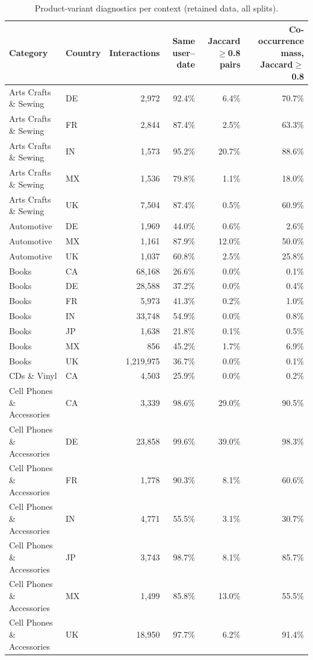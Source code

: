 \begin{longtable}{llrrrr}
\caption{Product-variant diagnostics per context (retained data, all splits).}\label{tab:variant_diag}\\
\toprule
Category & Country & Interactions & Same user--date & Jaccard$\ge$0.8 pairs & Co-occurrence mass, Jaccard$\ge$0.8 \\
\midrule\endhead
Arts Crafts \& Sewing & DE & 2,972 & 92.4\% & 6.4\% & 70.7\% \\
Arts Crafts \& Sewing & FR & 2,844 & 87.4\% & 2.5\% & 63.3\% \\
Arts Crafts \& Sewing & IN & 1,573 & 95.2\% & 20.7\% & 88.6\% \\
Arts Crafts \& Sewing & MX & 1,536 & 79.8\% & 1.1\% & 18.0\% \\
Arts Crafts \& Sewing & UK & 7,504 & 87.4\% & 0.5\% & 60.9\% \\
Automotive & DE & 1,969 & 44.0\% & 0.6\% & 2.6\% \\
Automotive & MX & 1,161 & 87.9\% & 12.0\% & 50.0\% \\
Automotive & UK & 1,037 & 60.8\% & 2.5\% & 25.8\% \\
Books & CA & 68,168 & 26.6\% & 0.0\% & 0.1\% \\
Books & DE & 28,588 & 37.2\% & 0.0\% & 0.4\% \\
Books & FR & 5,973 & 41.3\% & 0.2\% & 1.0\% \\
Books & IN & 33,748 & 54.9\% & 0.0\% & 0.8\% \\
Books & JP & 1,638 & 21.8\% & 0.1\% & 0.5\% \\
Books & MX & 856 & 45.2\% & 1.7\% & 6.9\% \\
Books & UK & 1,219,975 & 36.7\% & 0.0\% & 0.1\% \\
CDs \& Vinyl & CA & 4,503 & 25.9\% & 0.0\% & 0.2\% \\
Cell Phones \& Accessories & CA & 3,339 & 98.6\% & 29.0\% & 90.5\% \\
Cell Phones \& Accessories & DE & 23,858 & 99.6\% & 39.0\% & 98.3\% \\
Cell Phones \& Accessories & FR & 1,778 & 90.3\% & 8.1\% & 60.6\% \\
Cell Phones \& Accessories & IN & 4,771 & 55.5\% & 3.1\% & 30.7\% \\
Cell Phones \& Accessories & JP & 3,743 & 98.7\% & 8.1\% & 85.7\% \\
Cell Phones \& Accessories & MX & 1,499 & 85.8\% & 13.0\% & 55.5\% \\
Cell Phones \& Accessories & UK & 18,950 & 97.7\% & 6.2\% & 91.4\% \\

\end{longtable}
